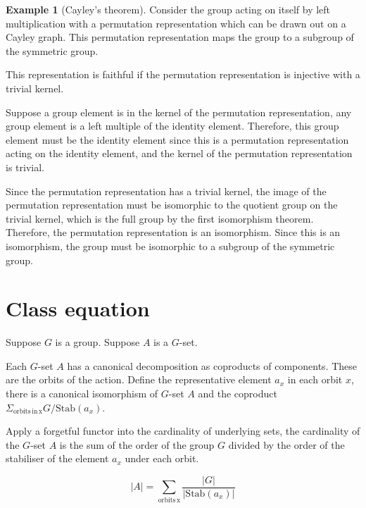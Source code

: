 \documentclass[10pt]{article}
\theoremstyle{plain}%
\theoremstyle{definition}
\newtheorem{example}{Example}[section]
\theoremstyle{remark}
\begin{document}
\begin{example}[Cayley's theorem]
	Consider the group acting on itself by left multiplication with a permutation representation which can be drawn out on a Cayley graph. 
	This permutation representation maps the group to a subgroup of the symmetric group.

	This representation is faithful if the permutation representation is injective with a trivial kernel.
	
	Suppose a group element is in the kernel of the permutation representation, any group element is a left multiple of the identity element. Therefore, this group element must be the identity element since this is a permutation representation acting on the identity element, and the kernel of the permutation representation is trivial.

	Since the permutation representation has a trivial kernel, the image of the permutation representation must be isomorphic to the quotient group on the trivial kernel, which is the full group by the first isomorphism theorem. Therefore, the permutation representation is an isomorphism. Since this is an isomorphism, the group must be isomorphic to a subgroup of the symmetric group. 
\end{example}

\section{Class equation}


Suppose $G$ is a group. Suppose $A$ is a $G$-set.

Each $G$-set $A$ has a canonical decomposition as coproducts of components. These are the orbits of the action. Define the representative element $a_x$ in each orbit $x$, there is a canonical isomorphism of $G$-set $A$ and the coproduct $\Sigma_{\mathrm{orbits \, in \, x}} G / \mathrm{Stab}(a_x)$.

Apply a forgetful functor into the cardinality of underlying sets, the cardinality of the $G$-set $A$ is the sum of the order of the group $G$ divided by the order of the stabiliser of the element $a_x$ under each orbit.

\begin{equation}
	|A| = \sum_{\mathrm{orbits \, x}}
	\dfrac{|G|}{|\mathrm{Stab}(a_x)|}
\end{equation}
\end{document}
